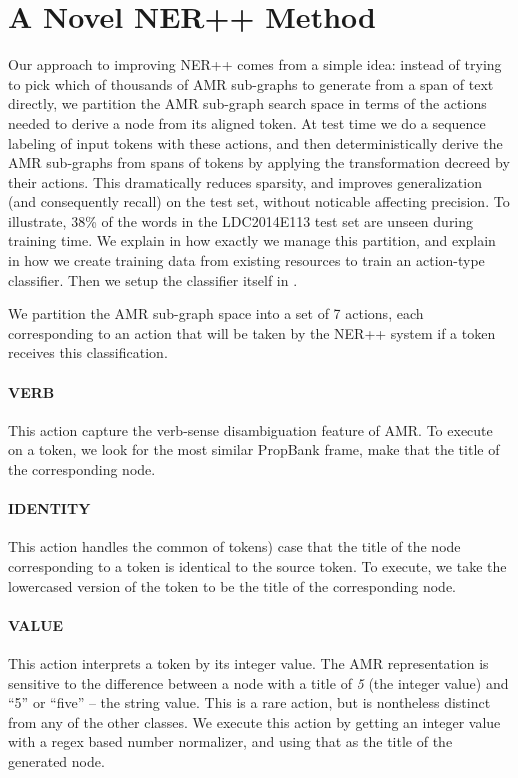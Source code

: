 \documentclass[11pt]{article}
\newcommand\n[1]{\textit{#1}} %
\begin{document}
\section{A Novel NER++ Method}\label{sec:nerplusplus}
Our approach to improving NER++ comes from a simple idea: instead of trying to pick 
  which of thousands of AMR sub-graphs to generate from a span of text directly, 
  we partition the AMR sub-graph search space in terms of the actions needed to 
  derive a node from its aligned token. 
At test time we do a sequence labeling of input tokens with these actions, and 
  then deterministically derive the AMR sub-graphs from spans of tokens by applying 
  the transformation decreed by their actions. 
This dramatically reduces sparsity, and improves generalization (and consequently
  recall) on the test set, without noticable affecting precision.
To illustrate, 38\% of the words in the LDC2014E113 test set are 
  unseen during training time.
We explain in  how exactly we manage this partition, and explain in  how we create training data from existing resources to train an action-type classifier. Then we setup the classifier itself in .


We partition the AMR sub-graph space into a set of 7 actions, each corresponding to an action that will be taken by the NER++ system if a token receives this classification.

\paragraph{VERB} This action capture the verb-sense disambiguation feature of AMR. To execute on a token, we look for the most similar PropBank frame, make that the title of the corresponding node.

\paragraph{IDENTITY} This action handles the common of tokens) case that the title of the node corresponding to a token is identical to the source token. To execute, we take the lowercased version of the token to be the title of the corresponding node.

\paragraph{VALUE} This action interprets a token by its integer value. 
The AMR representation is sensitive to the difference between a node with a title
  of \n{5} (the integer value) and ``5'' or ``five'' -- the string value.
This is a rare action, but is nontheless distinct from any of the other classes.
We execute this action by getting an integer value with a regex based number normalizer, and using that as the title of the generated node.
\end{document}
